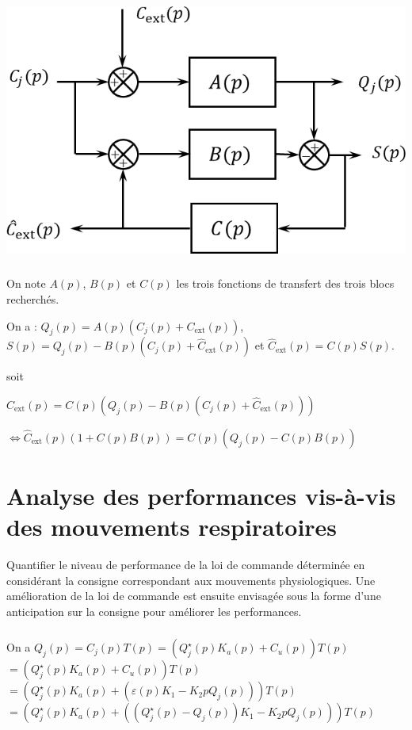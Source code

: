 \documentclass[10pt,fleqn]{article} %
\begin{document}
\begin{center}
\includegraphics[width=.4\linewidth]{images/fig_04}
\end{center}

\subparagraph{}%
On note $A(p)$, $B(p)$ et $C(p)$ les trois fonctions de transfert des trois blocs recherchés. 


On a : $Q_j(p)=A(p)\left(C_j(p)+C_{\text{ext}}(p)\right)$, 
$S(p)=Q_j(p)-B(p)\left( C_j(p)+\hat{C}_{\text{ext}}(p) \right)$
et  $\hat{C}_{\text{ext}}(p)=C(p)S(p)$.

 soit 

$\hat{C}_{\text{ext}}(p)=C(p)\left(Q_j(p)-B(p)\left( C_j(p)+\hat{C}_{\text{ext}}(p) \right)\right)$

$\Leftrightarrow \hat{C}_{\text{ext}}(p) \left(1+ C(p)B(p)\right)=C(p)\left(Q_j(p)-C(p)B(p) \right)$

\subparagraph{}%

\subparagraph{}%

\subparagraph{}%


\section{Analyse des performances vis-à-vis des mouvements respiratoires}
\begin{obj}
Quantifier le niveau de performance de la loi de commande déterminée en considérant la consigne
correspondant aux mouvements physiologiques. Une amélioration de la loi de commande est ensuite
envisagée sous la forme d’une anticipation sur la consigne pour améliorer les performances.
\end{obj}


\subparagraph{}\textit{}%
\subparagraph{}\textit{}%

\subparagraph{}\textit{}%

On a $Q_j(p) = C_j(p) T(p)= \left( Q_j^{\star}(p) K_a(p) + C_u(p) \right) T(p)$
$= \left( Q_j^{\star}(p) K_a(p) + C_u(p) \right) T(p)$
$= \left( Q_j^{\star}(p) K_a(p) + \left( \varepsilon(p) K_1 - K_2 p Q_j(p) \right)\right) T(p)$
$= \left( Q_j^{\star}(p) K_a(p) + \left( \left(Q_j^{\star}(p) - Q_j(p) \right) K_1 - K_2 p Q_j(p) \right)\right) T(p)$
\end{document}
